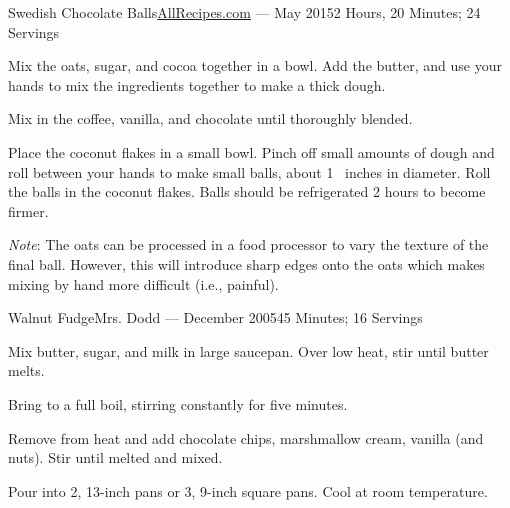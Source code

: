 \documentclass{article}
\begin{document}
\begin{recipe}{Swedish Chocolate Balls}{\href{http://www.allrecipes.com/recipe/swedish-chocolate-balls-or-coconut-balls/}{AllRecipes.com} --- May 2015}{2 Hours, 20 Minutes; 24 Servings}

   Mix the oats, sugar, and cocoa together in a bowl. Add the butter, and use your
   hands to mix the ingredients together to make a thick dough.

   Mix in the coffee, vanilla, and chocolate until thoroughly blended.

   Place the coconut flakes in a small bowl. Pinch off small amounts of dough and
   roll between your hands to make small balls, about 1\  inches in diameter.
   Roll the balls in the coconut flakes. Balls should be refrigerated 2 hours to
   become firmer.

   \freeform
   \emph{Note}: The oats can be processed in a food processor to vary the
   texture of the final ball.  However, this will introduce sharp edges onto
   the oats which makes mixing by hand more difficult (i.e., painful).

\end{recipe}

\begin{recipe}{Walnut Fudge}{Mrs. Dodd --- December 2005}{45 Minutes; 16 Servings}

   Mix butter, sugar, and milk in large saucepan.  Over low heat, stir until
   butter melts.

   \newstep
   Bring to a full boil, stirring constantly for five minutes.

   Remove from heat and add chocolate chips, marshmallow cream, vanilla (and
   nuts).  Stir until melted and mixed.

   \newstep
   Pour into 2, 13-inch pans or 3, 9-inch square pans.  Cool at room
   temperature.

\end{recipe}

\end{document}
